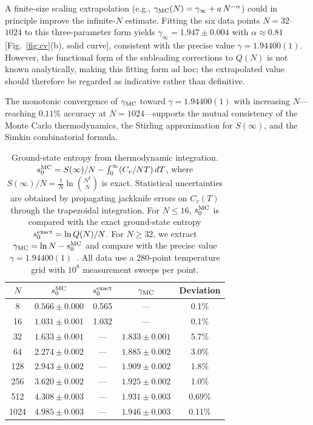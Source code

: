 \documentclass[aps, pre, reprint, amsmath, amssymb, superscriptaddress, floatfix]{revtex4-2}
\begin{document}
A finite-size scaling extrapolation
(e.g., $\gamma_{\rm MC}(N) = \gamma_\infty + a\,N^{-\alpha}$) could in
principle improve the infinite-$N$ estimate.  Fitting the six data
points $N = 32$--$1024$ to this three-parameter form yields
$\gamma_\infty = 1.947 \pm 0.004$ with $\alpha \approx 0.81$
[Fig.~\ref{fig:cv}(b), solid curve], consistent with the precise
value $\gamma = 1.94400(1)$.  However, the functional form of the
subleading corrections to $Q(N)$ is not known analytically, making
this fitting form ad hoc; the extrapolated value should therefore
be regarded as indicative rather than definitive.

The monotonic convergence of $\gamma_{\rm MC}$ toward $\gamma = 1.94400(1)$ with
increasing $N$---reaching $0.11\%$ accuracy at $N = 1024$---supports
the mutual consistency of the Monte Carlo
thermodynamics, the Stirling approximation for $S(\infty)$, and the
Simkin combinatorial formula.

\begin{table}[t]
  \caption{Ground-state entropy from thermodynamic integration.
  $s_0^{\rm MC} = S(\infty)/N - \int_0^\infty (C_v/NT)\,dT$, where
  $S(\infty)/N = \frac{1}{N}\ln\binom{N^2}{N}$ is exact.
  Statistical uncertainties are obtained by propagating jackknife
  errors on $C_v(T)$ through the trapezoidal integration.
  For $N \le 16$, $s_0^{\rm MC}$ is compared with the exact
  ground-state entropy $s_0^{\rm exact} = \ln Q(N)/N$.
  For $N \ge 32$, we extract
  $\gamma_{\rm MC} = \ln N - s_0^{\rm MC}$ and compare with the
  precise value $\gamma = 1.94400(1)$~\cite{Nobel2023}.
  All data use a 280-point temperature grid with $10^8$
  measurement sweeps per point.}
  \label{tab:entropy_check}
  \begin{ruledtabular}
  \begin{tabular}{ccccc}
    $N$ & $s_0^{\rm MC}$
    & $s_0^{\rm exact}$
    & $\gamma_{\rm MC}$
    & Deviation \\
    \midrule
    8   & $0.566 \pm 0.000$ & 0.565 & --- & 0.1\% \\
    16  & $1.031 \pm 0.001$ & 1.032 & --- & 0.1\% \\
    \midrule
    32  & $1.633 \pm 0.001$ & --- & $1.833 \pm 0.001$ & 5.7\% \\
    64  & $2.274 \pm 0.002$ & --- & $1.885 \pm 0.002$ & 3.0\% \\
    128 & $2.943 \pm 0.002$ & --- & $1.909 \pm 0.002$ & 1.8\% \\
    256 & $3.620 \pm 0.002$ & --- & $1.925 \pm 0.002$ & 1.0\% \\
    512 & $4.308 \pm 0.003$ & --- & $1.931 \pm 0.003$ & 0.69\% \\
    1024 & $4.985 \pm 0.003$ & --- & $1.946 \pm 0.003$ & 0.11\% \\
  \end{tabular}
  \end{ruledtabular}
\end{table}
\end{document}
